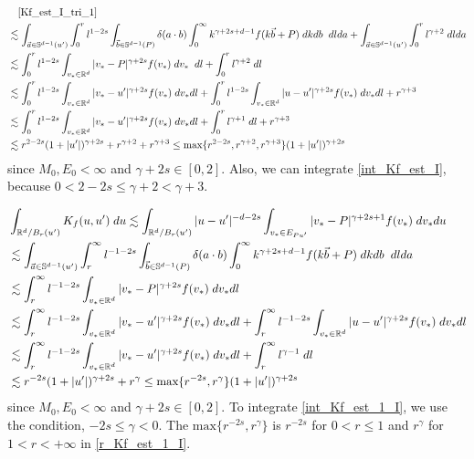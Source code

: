 \documentclass[10pt,a4paper]{amsart}
\begin{document}
\begin{align}
      & \quad\eqref{Kf_est_I_tri_1} \notag \\ 
      &\lesssim \int_{\vec{a} \in \mathbb{S}^{d-1}(u')} \int_0^r l^{1-2s} \int_{\vec{b}\in \mathbb{S}^{d-1}(P)} \delta(a \cdot b)\int_0^{\infty} {k}^{\gamma+2s+d-1}f(k\vec{b}+P) \; dk db \;\; dlda +
      \int_{\vec{a} \in \mathbb{S}^{d-1}(u')}\int_0^r l^{\gamma+2} \; dlda  \notag \\
     &\lesssim  \int_0^r l^{1-2s} \int_{v_* \in \mathbb{R}^{d}} {|v_*-P|^{\gamma+2s}}f(v_*) \; dv_* \;\; dl +
     \int_0^r l^{\gamma+2} \;dl \label{extend_Kf_est_I} \\
     &\lesssim \int_0^r l^{1-2s} \int_{v_* \in \mathbb{R}^{d}} {|v_*-u'|^{\gamma+2s}}f(v_*) \; dv_*  dl + \int_0^r l^{1-2s} \int_{v_* \in \mathbb{R}^{d}} {|u-u'|^{\gamma+2s}}f(v_*) \; dv_* dl + r^{\gamma+3}  \notag\\
     & \lesssim \int_0^r l^{1-2s} \int_{v_* \in \mathbb{R}^{d}} {|v_*-u'|^{\gamma+2s}}f(v_*) \; dv_*  dl + \int_0^r l^{\gamma+1}\; dl + r^{\gamma+3} \label{int_Kf_est_I} \\ 
     &\lesssim r^{2-2s}(1+|u'|)^{\gamma+2s}+r^{\gamma+2}+r^{\gamma+3} \leq \text{max}\{r^{2-2s},r^{\gamma+2},r^{\gamma+3}\}(1+|u'|)^{\gamma+2s} \label{r_Kf_est_I}
\end{align} since $M_0, E_0 < \infty$ and $\gamma+2s \in [0,2].$ Also, we can integrate \eqref{int_Kf_est_I}, because $0<2-2s \leq \gamma+2<\gamma+3.$  

\begin{align}
    &\int_{\mathbb{R}^d/B_{r}(u')}K_f(u,u')\; du
    \lesssim
     \int_{\mathbb{R}^d/B_{r}(u')}|u-u'|^{-d-2s} \int_{v_*\in E_{Pu'}}|v_*-P|^{\gamma+2s+1}f(v_*) \; dv_*du  \notag \\
    &\lesssim \int_{\vec{a} \in \mathbb{S}^{d-1}(u')} \int_r^{\infty} l^{-1-2s} \int_{\vec{b}\in \mathbb{S}^{d-1}(P)} \delta(a \cdot b)\int_0^{\infty} {k}^{\gamma+2s+d-1}f(k\vec{b}+P) \; dk db \;\; dlda  \notag \\
    &\lesssim \int_r^{\infty} l^{-1-2s} \int_{v_* \in \mathbb{R}^{d}} {|v_*-P|^{\gamma+2s}}f(v_*) \; dv_*  dl  \notag \\
    & \lesssim \int_r^{\infty} l^{-1-2s} \int_{v_* \in \mathbb{R}^{d}} {|v_*-u'|^{\gamma+2s}}f(v_*) \; dv_*  dl + \int_r^{\infty} l^{-1-2s} \int_{v_* \in \mathbb{R}^{d}} {|u-u'|^{\gamma+2s}}f(v_*) \; dv_*  dl  \notag  \\
    &\lesssim \int_r^{\infty} l^{-1-2s} \int_{v_* \in \mathbb{R}^{d}} {|v_*-u'|^{\gamma+2s}}f(v_*) \; dv_*  dl + \int_r^{\infty} l^{\gamma-1}\; dl  \label{int_Kf_est_1_I} \\
    &\lesssim r^{-2s}(1+|u'|)^{\gamma+2s}+r^{\gamma}
    \leq \text{max}\{r^{-2s},r^{\gamma}\}(1+|u'|)^{\gamma+2s} \label{r_Kf_est_1_I}
\end{align} since $M_0, E_0 < \infty$ and $\gamma+2s \in [0,2].$ To integrate \eqref{int_Kf_est_1_I}, we use the condition, $-2s \leq \gamma<0$. The $\text{max}\{r^{-2s},r^{\gamma}\}$ is $r^{-2s}$ for $0<r\leq 1$ and $r^{\gamma}$ for $1<r<+\infty$ in \eqref{r_Kf_est_1_I}.
\end{document}
